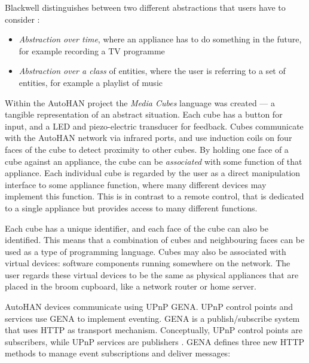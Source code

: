 Blackwell distinguishes between two different abstractions that users have to consider  \cite{Blackwell2001}:
\begin{itemize}
	\item \emph{Abstraction over time}, where an appliance has to do something in the future, for example recording a TV programme
	\item \emph{Abstraction over a class} of entities, where the user is referring to a set of entities, for example a playlist of music
\end{itemize}


Within the AutoHAN project the \emph{Media Cubes} language was created --- a tangible representation of an abstract situation. Each cube has a button for input, and a LED and piezo-electric transducer for feedback. Cubes communicate with the AutoHAN network via infrared ports, and use induction coils on four faces of the cube to detect proximity to other cubes. By holding one face of a cube against an appliance, the cube can be \emph{associated} with some function of that appliance. Each individual cube is regarded by the user as a direct manipulation interface to some appliance function, where many different devices may implement this function. This is in contrast to a remote control, that is dedicated to a single appliance but provides access to many different functions. 

Each cube has a unique identifier, and each face of the cube can also be identified. This means that a combination of cubes and neighbouring faces can be used as a type of programming language. Cubes may also be associated with virtual devices: software components running somewhere on the network. The user regards these virtual devices to be the same as physical appliances that are placed in the broom cupboard, like a network router or home server.

AutoHAN devices communicate using \ac{UPnP} \ac{GENA}. \ac{UPnP} control points and services use \ac{GENA} to implement eventing. \ac{GENA} is a publish/subscribe system that uses HTTP as transport mechanism. Conceptually, \ac{UPnP} control points are subscribers, while \ac{UPnP} services are publishers \cite{Jeronimo2009}. \ac{GENA} defines three new HTTP methods to manage event subscriptions and deliver messages:

